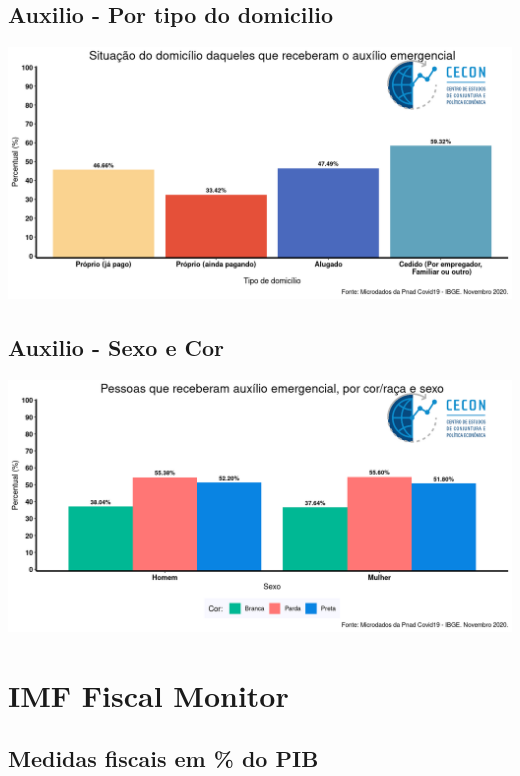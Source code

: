 \documentclass{SelfArx}
\begin{document}
\subsection*{Auxilio - Por tipo do domicilio}
\label{sec:org7492cdd}
\begin{center}
\includegraphics[width=.9\linewidth]{./figs/PNAD_COVID/auxilio_domicilio.png}
\end{center}
\subsection*{Auxilio - Sexo e Cor}
\label{sec:org5a78470}
\begin{center}
\includegraphics[width=.9\linewidth]{./figs/PNAD_COVID/auxilio_cor_sexo.png}
\end{center}


\section*{IMF Fiscal Monitor}
\label{sec:orgd729278}
\subsection*{Medidas fiscais em \% do PIB}
\label{sec:org1857c7c}
\end{document}
